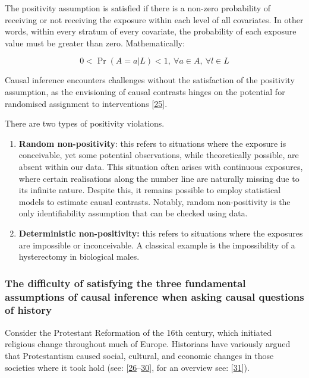 \documentclass[
  singlecolumn]{article}
\begin{document}
The positivity assumption is satisfied if there is a non-zero
probability of receiving or not receiving the exposure within each level
of all covariates. In other words, within every stratum of every
covariate, the probability of each exposure value must be greater than
zero. Mathematically:

\[
0 < \Pr(A=a|L)<1, ~ \forall a \in A, ~ \forall l \in L
\]

Causal inference encounters challenges without the satisfaction of the
positivity assumption, as the envisioning of causal contrasts hinges on
the potential for randomised assignment to interventions
{[}\protect\hyperlink{ref-westreich2010}{25}{]}.

There are two types of positivity violations.

\begin{enumerate}
\def\labelenumi{\arabic{enumi}.}
\item
  \textbf{Random non-positivity}: this refers to situations where the
  exposure is conceivable, yet some potential observations, while
  theoretically possible, are absent within our data. This situation
  often arises with continuous exposures, where certain realisations
  along the number line are naturally missing due to its infinite
  nature. Despite this, it remains possible to employ statistical models
  to estimate causal contrasts. Notably, random non-positivity is the
  only identifiability assumption that can be checked using data.
\item
  \textbf{Deterministic non-positivity:} this refers to situations where
  the exposures are impossible or inconceivable. A classical example is
  the impossibility of a hysterectomy in biological males.
\end{enumerate}

\hypertarget{the-difficulty-of-satisfying-the-three-fundamental-assumptions-of-causal-inference-when-asking-causal-questions-of-history}{%
\subsubsection{The difficulty of satisfying the three fundamental
assumptions of causal inference when asking causal questions of
history}\label{the-difficulty-of-satisfying-the-three-fundamental-assumptions-of-causal-inference-when-asking-causal-questions-of-history}}

Consider the Protestant Reformation of the 16th century, which initiated
religious change throughout much of Europe. Historians have variously
argued that Protestantism caused social, cultural, and economic changes
in those societies where it took hold (see:
{[}\protect\hyperlink{ref-weber1905}{26}--\protect\hyperlink{ref-basten2013}{30}{]},
for an overview see: {[}\protect\hyperlink{ref-becker2016}{31}{]}).
\end{document}
